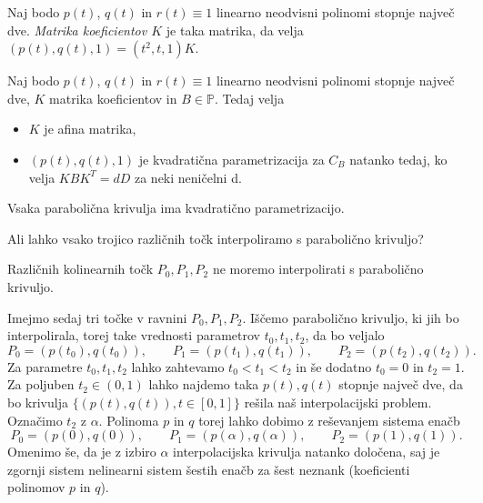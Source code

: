 \documentclass[mat1]{fmfdelo}
\newcommand{\PP}{\mathbb P}
\newcommand{\al}{\alpha}
\begin{document}
\begin{definicija}
Naj bodo $p(t)$, $q(t)$ in $r(t) \equiv 1$ linearno neodvisni polinomi stopnje največ dve. \emph{Matrika koeficientov $K$} je taka matrika, da velja $ (p(t), q(t), 1) = (t^2,t,1) K$.
\end{definicija} 

\begin{trditev}
Naj bodo $p(t)$, $q(t)$ in $r(t) \equiv 1$ linearno neodvisni polinomi stopnje največ dve, $K$ matrika koeficientov in $B \in \PP$. Tedaj velja
\begin{itemize}
\item $K$ je afina matrika,
\item  $ ( p(t), q(t), 1)$ je kvadratična parametrizacija za $C_B$ natanko tedaj, ko velja $K B K^T = d D$ za neki neničelni d.
\end{itemize}
\end{trditev}


\begin{posledica}
Vsaka parabolična krivulja ima kvadratično parametrizacijo.
\end{posledica}

Ali lahko vsako trojico različnih točk interpoliramo s parabolično krivuljo? 

\begin{trditev}
Različnih kolinearnih točk $P_0, P_1, P_2$ ne moremo interpolirati s parabolično krivuljo.
\end{trditev}

Imejmo sedaj tri točke v ravnini $P_0, P_1, P_2$. Iščemo parabolično krivuljo, ki jih bo interpolirala, torej take vrednosti parametrov $t_0, t_1, t_2$, da bo veljalo
$$ P_0 = (p(t_0), q(t_0)), \qquad P_1 = (p(t_1), q(t_1)), \qquad P_2 = (p(t_2), q(t_2)).$$
Za parametre $t_0, t_1, t_2$ lahko zahtevamo $t_0 < t_1 < t_2$ in še dodatno $t_0 = 0$ in $t_2 = 1$. Za poljuben $t_2 \in (0,1)$  lahko najdemo taka $p(t), q(t)$ stopnje največ dve, da bo krivulja $ \{(p(t), q(t)), t \in [0,1] \}$ rešila naš interpolacijski problem. Označimo $t_2$ z $\al.$  Polinoma $p$ in $q$ torej lahko dobimo z reševanjem sistema enačb
\begin{equation}\label{sistem}
P_0 = (p(0), q(0)), \qquad P_1 = (p(\al), q(\al)), \qquad P_2 = (p(1), q(1)).
\end{equation}
Omenimo še, da je z izbiro $\al$ interpolacijska krivulja natanko določena, saj je zgornji sistem nelinearni sistem šestih enačb za šest neznank (koeficienti polinomov $p$ in $q$).
\end{document}
